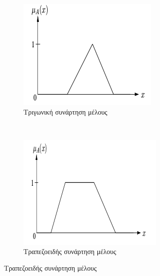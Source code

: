 \documentclass{assignment}
\begin{document}
\begin{figure}[htbp]
  \centering
  \begin{subfigure}[b]{0.5\textwidth}
     \includegraphics[width=\textwidth,height=0.25\textheight]{images/fuzzy_logic_membership_function_triangular.png}
  \caption{Τριγωνική συνάρτηση μέλους}
  \end{subfigure}%
   ~ %
  \begin{subfigure}[b]{0.5\textwidth}
    \includegraphics[width=\textwidth,height=0.25\textheight]{images/fuzzy_logic_membership_function_trapezoidal.png}
  \caption{Τραπεζοειδής συνάρτηση μέλους}

\end{subfigure}
\end{figure}
\end{document}
